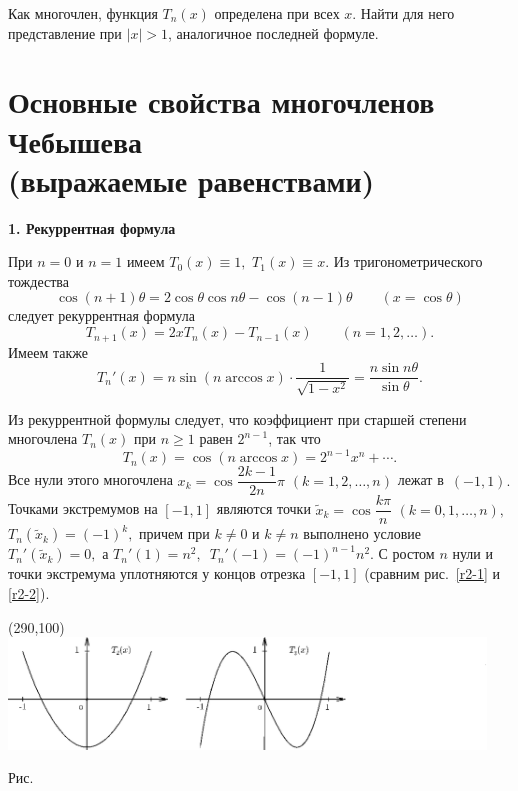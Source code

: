 \begin{ex}
{Как многочлен, функция $T_n(x)$ определена при всех $x$. Найти} {для него
представление при $|x| > 1$, аналогичное последней формуле.}
\end{ex}

\section{Основные свойства многочленов Чебышева \\
(выражаемые равенствами)}

\vspace{-2mm}
{\bf 1. Рекуррентная формула}
\vspace{3mm}

При $n=0$ и $n=1$ имеем $T_0(x) \equiv 1,$ $T_1(x) \equiv x.$ Из тригонометрического тождества
\[
  \cos (n+1)\theta =2 \cos \theta \cos n \theta -\cos (n-1)\theta
  \qquad (x = \cos{\theta})
\]
следует {рекуррентная формула}
\[
  T_{n+1}(x)=2x T_n(x)-T_{n-1}(x) \qquad (n=1,2,\dots ).
\]
{Имеем также}
$$
 {T_n'(x)=n \sin ({n} \arccos{x})\cdot \frac{1}{\sqrt{1-x^2}} = \frac{n\sin
 n\theta}{\sin{\theta}}.}
$$

Из рекуррентной формулы следует, что коэффициент при старшей степени многочлена
{$T_n(x)$ при $n \ge 1$} равен $2^{n-1}$, так что
\[
  T_n(x)=\cos (n \arccos x) =2^{n-1} x^n+\cdots .
\]
Все нули этого многочлена $x_k=\cos \dfrac{2k-1}{2n}\pi$
$(k=1,2,\dots ,n)$ лежат в~$(-1,1).$ {Точками} экстремумов
на $[-1,1]$ являются {точки} $\widetilde x_k=\cos \dfrac{k
\pi}{n}$ {$(k=0,1,\dots ,n),$} $T_n(\widetilde x_k)=(-1)^k,$
причем при {$k\ne 0$} и {$k \ne n$} выполнено {условие
$T_n'(\widetilde x_k) = 0,$ а $T_n'(1)=n^2,$}\
{$T_n'(-1)=(-1)^{n-1}n^2$. С ростом $n$ нули и точки
экстремума уплотняются у концов} {отрезка $[-1,1]$} (сравним
рис.~\ref{r2-1} и \ref{r2-2}).


\begin{center}
\begin{picture}(290,100)
\includegraphics[width=0.95\textwidth]{pict02-1.eps}
\end{picture}
\centerline{\normalsize Рис.~\theris}

\label{r2-1}
\end{center}



